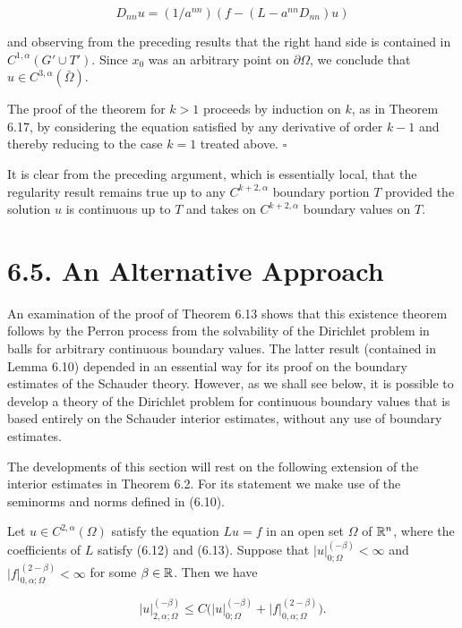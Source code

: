 \[
D_{nn}u=(1/a^{nn})(f-(L-a^{nn}D_{nn})u)
\]

and observing from the preceding results that the right hand side is contained in $C^{1,\alpha}(G' \cup T')$. Since $x_0$ was an arbitrary point on $\partial\Omega$, we conclude that $u\in C^{3,\alpha}(\bar{\Omega})$.

The proof of the theorem for $k>1$ proceeds by induction on $k$, as in Theorem 6.17, by considering the equation satisfied by any derivative of order $k-1$ and thereby reducing to the case $k=1$ treated above. $\square$

It is clear from the preceding argument, which is essentially local, that the regularity result remains true up to any $C^{k+2,\alpha}$ boundary portion $T$ provided the solution $u$ is continuous up to $T$ and takes on $C^{k+2,\alpha}$ boundary values on $T$.

\section*{6.5. An Alternative Approach}

An examination of the proof of Theorem 6.13 shows that this existence theorem follows by the Perron process from the solvability of the Dirichlet problem in balls for arbitrary continuous boundary values. The latter result (contained in Lemma 6.10) depended in an essential way for its proof on the boundary estimates of the Schauder theory. However, as we shall see below, it is possible to develop a theory of the Dirichlet problem for continuous boundary values that is based entirely on the Schauder interior estimates, without any use of boundary estimates.

The developments of this section will rest on the following extension of the interior estimates in Theorem 6.2. For its statement we make use of the seminorms and norms defined in (6.10).

\begin{lemma}[6.20]
Let $u\in C^{2,\alpha}(\Omega)$ satisfy the equation $Lu=f$ in an open set $\Omega$ of $\mathbb{R}^n$, where the coefficients of $L$ satisfy (6.12) and (6.13). Suppose that $\lvert u\rvert_{0;\Omega}^{(-\beta)}<\infty$ and $\lvert f\rvert_{0,\alpha;\Omega}^{(2-\beta)}<\infty$ for some $\beta\in\mathbb{R}$. Then we have
\end{lemma}

\begin{equation}
\tag{6.50}
\lvert u\rvert_{2,\alpha;\Omega}^{(-\beta)}\leq C\bigl(\lvert u\rvert_{0;\Omega}^{(-\beta)}+\lvert f\rvert_{0,\alpha;\Omega}^{(2-\beta)}\bigr).
\end{equation}

